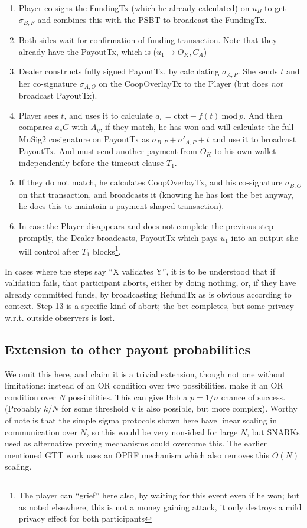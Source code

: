 \documentclass[11pt]{article}
\begin{document}
\begin{enumerate}
\item Player co-signs the FundingTx (which he already calculated) on $u_B$ to get $\sigma_{B, F}$ and combines this with the PSBT to broadcast the FundingTx.
\item Both sides wait for confirmation of funding transaction. Note that they already have the PayoutTx, which is ($u_1 \rightarrow O_K, C_A$)
\item Dealer constructs fully signed PayoutTx, by calculating $\sigma_{A,P}$. She sends $t$ and her co-signature $\sigma_{A, O}$ on the CoopOverlayTx to the Player (but does \emph{not} broadcast PayoutTx).
\item Player sees $t$, and uses it to calculate $a_c = \textrm{ctxt} - f(t) \ \textrm{mod}\ p$. And then compares $a_c G$ with $A_y$, if they match, he has won and will calculate the full MuSig2 cosignature on PayoutTx as $\sigma_{B,P} + \sigma'_{A, P} + t$ and use it to broadcast PayoutTx. And must send another payment from $O_K$ to his own wallet independently before the timeout clause $T_1$.
\item If they do not match, he calculates CoopOverlayTx, and his co-signature $\sigma_{B,O}$ on that transaction, and broadcasts it (knowing he has lost the bet anyway, he does this to maintain a payment-shaped transaction).
\item In case the Player disappears and does not complete the previous step promptly, the Dealer broadcasts, PayoutTx which pays $u_1$ into an output she will control after $T_1$ blocks\footnote{The player can ``grief'' here also, by waiting for this event even if he won; but as noted elsewhere, this is not a money gaining attack, it only destroys a mild privacy effect for both participants}.
\end{enumerate}

In cases where the steps say ``X validates Y'', it is to be understood that if validation fails, that participant aborts, either by doing nothing, or, if they have already committed funds, by broadcasting RefundTx as is obvious according to context. Step 13 is a specific kind of abort; the bet completes, but some privacy w.r.t. outside observers is lost.

\subsection{Extension to other payout probabilities}

We omit this here, and claim it is a trivial extension, though not one without limitations: instead of an OR condition over two possibilities, make it an OR condition over $N$ possibilities. This can give Bob a $p=1/n$ chance of success. (Probably $k/N$ for some threshold $k$ is also possible, but more complex). Worthy of note is that the simple sigma protocols shown here have linear scaling in communication over $N$, so this would be very non-ideal for large $N$, but SNARKs used as alternative proving mechanisms could overcome this. The earlier mentioned GTT work \cite{gerhardt2026} uses an OPRF mechanism which also removes this $O(N)$ scaling.
\end{document}
